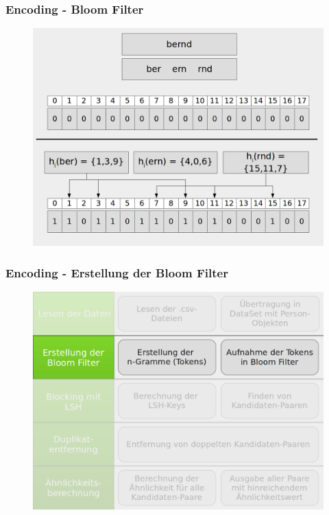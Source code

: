 \documentclass{beamer}
\begin{document}
    \begin{frame}
    		\frametitle{Encoding - Bloom Filter}
            \begin{figure}[H]
                \includegraphics[width=\textwidth]{graphics/bloom_qgram.png}
            \end{figure}
    \end{frame}

    \begin{frame}
    		\frametitle{Encoding - Erstellung der Bloom Filter}
    		\begin{figure}[H]
    			\includegraphics[width=\textwidth]{graphics/process_2.png}
    		\end{figure}
    \end{frame}
    
\end{document}
